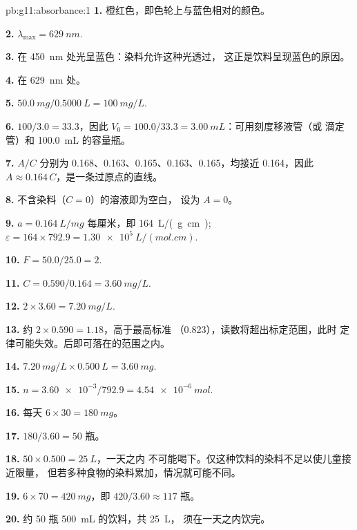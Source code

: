 \begin{solution}{pb:g11:absorbance:1}
\textbf{1.} 橙红色，即色轮上与蓝色相对的颜色。

\textbf{2.} $\lambda_{\max} = \qty{629}{nm}$.

\textbf{3.} 在 \qty{450}{nm} 处光呈蓝色：染料允许这种光透过，
这正是饮料呈现蓝色的原因。

\textbf{4.} 在 \qty{629}{nm} 处。

\textbf{5.} $\qty{50.0}{mg} / \qty{0.5000}{L} = \qty{100}{mg/L}$.

\textbf{6.}  $100 / 3.0 = 33.3$，因此
$V_0 = 100.0 / 33.3 = \qty{3.00}{mL}$：可用刻度移液管（或
滴定管）和 \qty{100.0}{mL} 的容量瓶。

\textbf{7.} $A/C$ 分别为 0.168、0.163、0.165、0.163、0.165，均接近
0.164，因此 $A \approx 0.164\, C$，是一条过原点的直线。

\textbf{8.} 不含染料（$C = 0$）的溶液即为空白，
设为 $A = 0$。

\textbf{9.} $a = \qty{0.164}{L/mg}$ 每厘米，即
\qty{164}{L/(g.cm)}; $\varepsilon = 164 \times 792.9 =
\qty{1.30e5}{L/(mol.cm)}$.

\textbf{10.} $F = 50.0 / 25.0 = 2$.

\textbf{11.} $C = 0.590 / 0.164 = \qty{3.60}{mg/L}$.

\textbf{12.} $2 \times 3.60 = \qty{7.20}{mg/L}$.

\textbf{13.} 约 $2 \times 0.590 = 1.18$，高于最高标准
（0.823），读数将超出标定范围，此时
定律可能失效。后即可落在的范围之内。

\textbf{14.} $\qty{7.20}{mg/L} \times \qty{0.500}{L} = \qty{3.60}{mg}$.

\textbf{15.} $n = \num{3.60e-3} / 792.9 = \qty{4.54e-6}{mol}$.

\textbf{16.} 每天 $6 \times 30 = \qty{180}{mg}$。

\textbf{17.} $180 / 3.60 = 50$ 瓶。

\textbf{18.} $50 \times 0.500 = \qty{25}{L}$，一天之内
不可能喝下。仅这种饮料的染料不足以使儿童接近限量，
但若多种食物的染料累加，情况就可能不同。

\textbf{19.} $6 \times 70 = \qty{420}{mg}$，即 $420 / 3.60 \approx
117$ 瓶。

\textbf{20.} 约 50 瓶 \qty{500}{mL} 的饮料，共 \qty{25}{L}，
须在一天之内饮完。
\end{solution}
